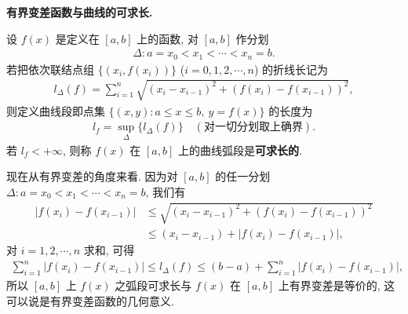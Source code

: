 \documentclass[../../main.tex]{subfiles}%
\begin{document}
\begin{remark}
\textbf{有界变差函数与曲线的可求长.}

设 $f(x)$ 是定义在 $[a,b]$ 上的函数, 对 $[a,b]$ 作分划
\begin{align*}
\Delta: a = x_0 < x_1 < \cdots < x_n = b.
\end{align*}
若把依次联结点组 $\{(x_i, f(x_i))\}$ ($i=0,1,2,\cdots,n$) 的折线长记为
\begin{align*}
l_\Delta(f) = \sum_{i=1}^n \sqrt{(x_i - x_{i-1})^2 + (f(x_i) - f(x_{i-1}))^2},
\end{align*}
则定义曲线段即点集 $\{(x,y): a\leqslant x\leqslant b,\ y=f(x)\}$ 的长度为
\begin{align*}
l_f = \sup_\Delta \{l_\Delta(f)\} \quad (\text{对一切分划取上确界}).
\end{align*}
若 $l_f < +\infty$, 则称 $f(x)$ 在 $[a,b]$ 上的曲线弧段是\textbf{可求长的}.

现在从有界变差的角度来看. 因为对 $[a,b]$ 的任一分划 $\Delta: a=x_0<x_1<\cdots<x_n=b$, 我们有
\begin{align*}
|f(x_i) - f(x_{i-1})| &\leqslant \sqrt{(x_i - x_{i-1})^2 + (f(x_i) - f(x_{i-1}))^2} \\
&\leqslant (x_i - x_{i-1}) + |f(x_i) - f(x_{i-1})|,
\end{align*}
对 $i=1,2,\cdots,n$ 求和, 可得
\begin{align*}
\sum_{i=1}^n |f(x_i) - f(x_{i-1})| \leqslant l_\Delta(f) \leqslant (b-a) + \sum_{i=1}^n |f(x_i) - f(x_{i-1})|,
\end{align*}
所以 $[a,b]$ 上 $f(x)$ 之弧段可求长与 $f(x)$ 在 $[a,b]$ 上有界变差是等价的, 这可以说是有界变差函数的几何意义.
\end{remark}
\end{document}
